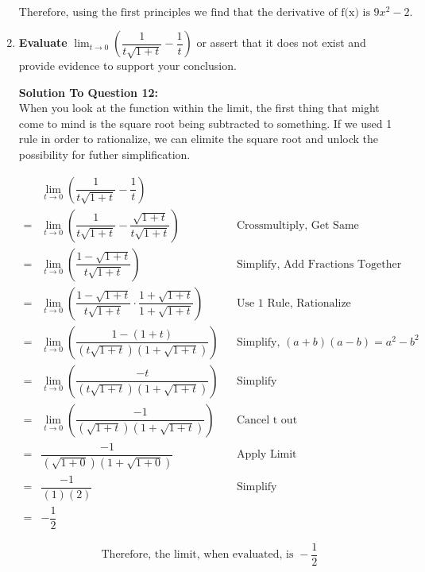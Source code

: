 \documentclass[12pt]{book}
\begin{document}
\begin{enumerate}
$$\boxed{\text{Therefore, using the first principles we find that the derivative of f(x) is } 9x^2 - 2 \text{.}}$$

\vspace{0.3cm}


\newpage


\item \textbf{Evaluate} $\lim_{t\to 0}\limits \left(\dfrac{1}{t\sqrt{1+t}} - \dfrac{1}{t}\right)$ or assert that it does not exist and provide evidence to support your conclusion.

\vspace{0.3cm} 
\textbf{Solution To Question 12:}\\
  When you look at the function within the limit, the first thing that might come to mind 
  is the square root being subtracted to something. If we used 1 rule in order to rationalize, 
  we can elimite the square root and unlock the possibility for futher simplification.
\vspace{0.1cm}

\addtolength{\jot}{0.5em}
\begin{align*}
    & \lim_{t \to 0} \left( \dfrac{1}{t \sqrt{1+t}} - \dfrac{1}{t} \right) && \\
    =& \lim_{t \to 0} \left( \dfrac{1}{t \sqrt{1+t}} - \dfrac{\sqrt{1+t}}{t \sqrt{1+t}} \right) && \text{Crossmultiply, Get Same Denominators} \\
    =& \lim_{t \to 0} \left( \dfrac{1-\sqrt{1+t}}{t \sqrt{1+t}} \right) && \text{Simplify, Add Fractions Together} \\
    =& \lim_{t \to 0} \left( \dfrac{1-\sqrt{1+t}}{t \sqrt{1+t}} \cdot \dfrac{1+\sqrt{1+t}}{1+\sqrt{1+t}} \right) && \text{Use 1 Rule, Rationalize} \\
    =& \lim_{t \to 0} \left( \dfrac{1-(1+t)}{(t \sqrt{1+t})(1+\sqrt{1+t})} \right) && \text{Simplify, } (a+b)(a-b) = a^2-b^2 \\
    =& \lim_{t \to 0} \left( \dfrac{-t}{(t \sqrt{1+t})(1+\sqrt{1+t})} \right) && \text{Simplify} \\
    =& \lim_{t \to 0} \left( \dfrac{-1}{(\sqrt{1+t})(1+\sqrt{1+t})} \right) && \text{Cancel t out} \\
    =& \dfrac{-1}{(\sqrt{1+0})(1+\sqrt{1+0})} && \text{Apply Limit} \\
    =& \dfrac{-1}{(1)(2)} && \text{Simplify} \\
    =& -\dfrac{1}{2}
\end{align*}

$$\boxed{\text{Therefore, the limit, when evaluated, is } -\dfrac{1}{2}}$$


\end{enumerate}
\end{document}
